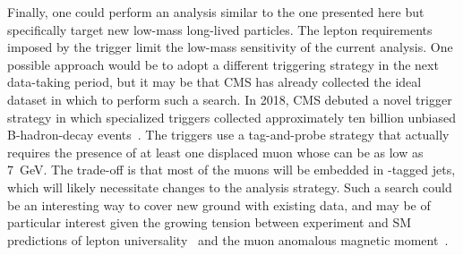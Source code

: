 Finally, one could perform an analysis similar to the one presented here but specifically target new low-mass long-lived particles. The lepton \pt requirements imposed by the trigger limit the low-mass sensitivity of the current analysis. One possible approach would be to adopt a different triggering strategy in the next data-taking period, but it may be that CMS has already collected the ideal dataset in which to perform such a search. In 2018, CMS debuted a novel trigger strategy in which specialized triggers collected approximately ten billion unbiased B-hadron-decay events~\cite{cms_b_parking}. The triggers use a tag-and-probe strategy that actually requires the presence of at least one displaced muon whose \pt can be as low as \SI{7}{\GeV}. The trade-off is that most of the muons will be embedded in \cPqb-tagged jets, which will likely necessitate changes to the analysis strategy. Such a search could be an interesting way to cover new ground with existing data, and may be of particular interest given the growing tension between experiment and SM predictions of lepton universality~\cite{lhcb} and the muon anomalous magnetic moment~\cite{g_minus_two}.